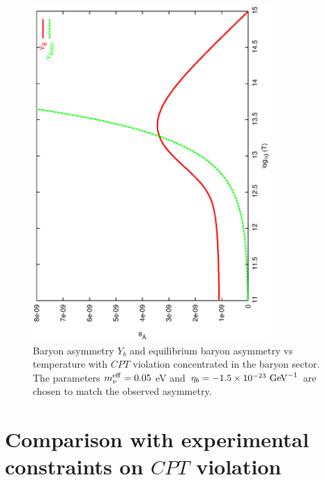 \documentclass[12pt]{revtex4}
\newcommand{\meff}{m^{\rm eff}_\nu}
\newcommand{\GeV}{{\rm GeV}}
\begin{document}
\begin{figure}
\includegraphics[width=9cm,angle=270]{b_dom_asymm_bau.ps}
\caption{Baryon asymmetry $ Y_b $ and equilibrium baryon asymmetry vs 
	temperature with $CPT$ violation concentrated in  the baryon sector. The parameters  
$\meff=0.05$ eV and $\eta_b = -1.5 \times 10^{-23}~\GeV^{-1}$ are chosen to match the observed asymmetry.}
\label{b_dom_asymm_bau}
\end{figure}

\section{Comparison with experimental constraints on $CPT$ violation}
\end{document}
